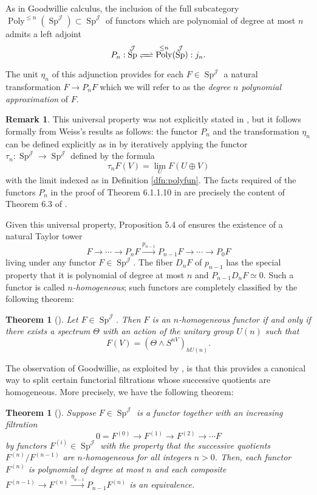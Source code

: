 \documentclass[reqno, oneside]{amsart}
\theoremstyle{definition}
\newtheorem{rmk}[nul]{Remark}
\theoremstyle{plain}
\newtheorem{thm}[nul]{Theorem}
\DeclareMathOperator{\Poly}{\text{Poly}}
\DeclareMathOperator{\Sp}{\text{Sp}}
\DeclareMathOperator{\J}{\mathcal{J}}
\begin{document}
As in Goodwillie calculus, the inclusion of the full subcategory $\Poly^{\leq n}(\Sp^{\J}) \subset \Sp^{\J}$ of functors which are polynomial of degree at most $n$ admits a left adjoint $$P_n: \Sp^{\J} \xrightleftharpoons{\quad} \Poly^{\leq n}(\Sp^{\J}): j_n.$$ %
 The unit $\eta_n$ of this adjunction provides for each $F\in \Sp^{\J}$ a natural transformation $F \to P_nF$ which we will refer to as the \emph{degree $n$ polynomial approximation} of $F$. 

\begin{rmk}\label{rmk:infinityweiss}
This universal property was not explicitly stated in \cite{Weiss}, but it follows formally from Weiss's results as follows: the functor $P_n$ and the transformation $\eta_n$ can be defined explicitly as in \cite{Weiss} by iteratively applying the functor $\tau_n: \Sp^{\J} \to \Sp^{\J}$ defined by the formula $$\tau_n F(V) = \lim_U F(U\oplus V)$$ with the limit indexed as in Definition \ref{dfn:polyfun}.   The facts required of the functors $P_n$ in the proof of Theorem 6.1.1.10 in \cite{HA} are precisely the content of Theorem 6.3 of \cite{Weiss}.  
\end{rmk}

Given this universal property, Proposition 5.4 of \cite{Weiss} ensures the existence of a natural Taylor tower $$F \longrightarrow \cdots \longrightarrow P_{n} F \xrightarrow{p_{n-1}} P_{n-1} F \longrightarrow \cdots \longrightarrow P_0F$$ living under any functor $F\in \Sp^{\J}.$  The fiber $D_n F$ of $p_{n-1}$ has the special property that it is polynomial of degree at most $n$ and $P_{n-1} D_n F \simeq 0$.  Such a functor is called \emph{$n$-homogeneous}; such functors are completely classified by the following theorem:

\begin{thm}[{{\cite[Theorem 7.3]{Weiss}}}]
Let $F\in \Sp^{\J}$.  Then $F$ is an $n$-homogeneous functor if and only if there exists a spectrum $\Theta$ with an action of the unitary group $U(n)$ such that $$F(V) = (\Theta \wedge S^{nV})_{hU(n)}.$$
\end{thm}


The observation of Goodwillie, as exploited by \cite{Arone}, is that this provides a canonical way to split certain functorial filtrations whose successive quotients are homogeneous.  More precisely, we have the following theorem:

\begin{thm}[\cite{Arone}]
Suppose $F \in \Sp^{\J}$ is a functor together with an increasing filtration $$0 = F^{(0)} \longrightarrow F^{(1)}\longrightarrow F^{(2)} \longrightarrow  \cdots F$$ by functors $F^{(i)}\in \Sp^{\J}$ with the property that the successive quotients $F^{(n)}/F^{(n-1)}$ are $n$-homogeneous for all integers $n>0$.  Then, each functor $F^{(n)}$ is polynomial of degree at most $n$ and each composite $F^{(n-1)} \longrightarrow F^{(n)} \xrightarrow{\eta_{n-1}} P_{n-1} F^{(n)}$ is an equivalence.
\end{thm}
\end{document}

